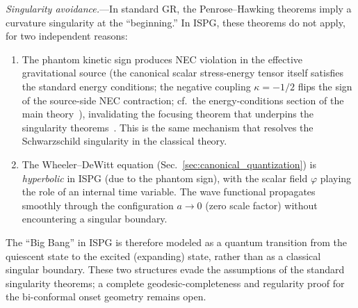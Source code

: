 \documentclass[aps,prd,onecolumn,superscriptaddress,nofootinbib,showpacs,12pt,notitlepage]{revtex4-2}
\begin{document}
\textit{Singularity avoidance.}---In standard GR, the
Penrose--Hawking theorems imply a curvature singularity
at the ``beginning.''  In ISPG, these theorems do not
apply, for two independent reasons:
\begin{enumerate}
\item The phantom kinetic sign produces NEC violation in
  the effective gravitational source (the canonical scalar
  stress-energy tensor itself satisfies the standard energy
  conditions; the negative coupling $\kappa=-1/2$ flips the
  sign of the source-side NEC contraction; cf.\ the
  energy-conditions section of the main theory~\cite{Lotishvili2026}),
  invalidating the focusing theorem
  that underpins the singularity
  theorems~\cite{Lotishvili2026}.  This is the same
  mechanism that resolves the Schwarzschild singularity
  in the classical theory.
\item The Wheeler--DeWitt equation
  (Sec.~\ref{sec:canonical_quantization}) is
  \emph{hyperbolic} in ISPG (due to the phantom sign),
  with the scalar field $\varphi$ playing the role of
  an internal time variable.  The wave functional
  propagates smoothly through the configuration
  $a \to 0$ (zero scale factor) without encountering
  a singular boundary.
\end{enumerate}
The ``Big Bang'' in ISPG is therefore modeled as a
quantum transition from the quiescent state to the
excited (expanding) state, rather than as a classical
singular boundary.  These two structures evade the
assumptions of the standard singularity theorems; a
complete geodesic-completeness and regularity proof for
the bi-conformal onset geometry remains open.
\end{document}
